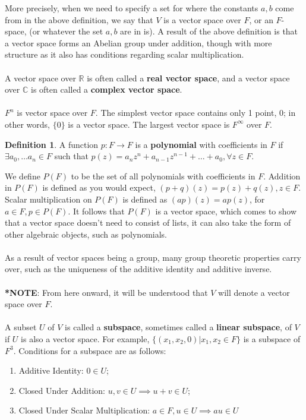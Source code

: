 \documentclass{article}
\theoremstyle{definition}
\newtheorem{defin}{Definition}[section]
\begin{document}
More precisely, when we need to specify a set for where the constants $a, b$ come from in the above definition, we say that $V$ is a vector space over $F$, or an $F$-space, (or whatever the set $a, b$ are in is). A result of the above definition is that a vector space forms an Abelian group under addition, though with more structure as it also has conditions regarding scalar multiplication. \\ \\
A vector space over $\mathbb{R}$ is often called a \textbf{real vector space}, and a vector space over $\mathbb{C}$ is often called a \textbf{complex vector space}. \\ \\
$F^n$ is vector space over $F$. The simplest vector space contains only 1 point, 0; in other words, $\{0\}$ is a vector space. The largest vector space is $F^{\infty}$ over $F$.
\begin{defin}
A function $p: F \rightarrow F$ is a \textbf{polynomial} with coefficients in $F$ if $\exists a_0, \dots a_n \in F$ such that $p(z) = a_n z^n + a_{n - 1}z^{n - 1} + \dots + a_0, \forall z \in F$.
\end{defin}
\noindent We define $P(F)$ to be the set of all polynomials with coefficients in $F$. Addition in $P(F)$ is defined as you would expect, $(p + q)(z) = p(z) + q(z), z \in F$. Scalar multiplication on $P(F)$ is defined as $(ap)(z) = ap(z)$, for $a \in F, p \in P(F)$. It follows that $P(F)$ is a vector space, which comes to show that a vector space doesn't need to consist of lists, it can also take the form of other algebraic objects, such as polynomials. \\ \\
As a result of vector spaces being a group, many group theoretic properties carry over, such as the uniqueness of the additive identity and additive inverse. \\ \\
\textbf{*NOTE}: From here onward, it will be understood that $V$ will denote a vector space over $F$. \\ \\
A subset $U$ of $V$ is called a \textbf{subspace}, sometimes called a \textbf{linear subspace}, of $V$ if $U$ is also a vector space. For example, $\{(x_1, x_2, 0) | x_1, x_2 \in F\}$ is a subspace of $F^3$. Conditions for a subspace are as follows: \begin{enumerate}
    \item Additive Identity: $0 \in U$;
    \item Closed Under Addition: $u, v \in U \implies u + v \in U$;
    \item Closed Under Scalar Multiplication: $a \in F, u \in U \implies au \in U$
\end{enumerate}
\end{document}
